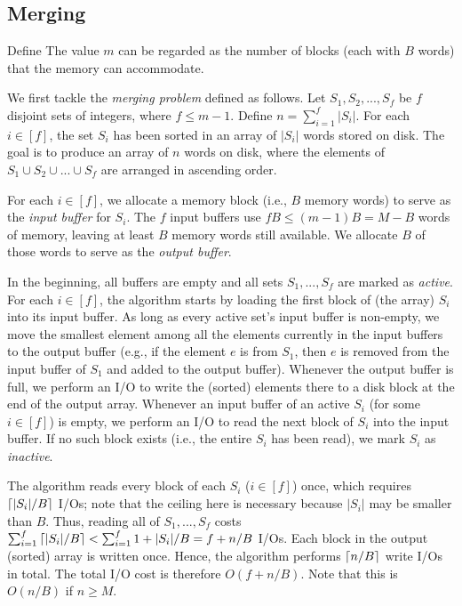 \subsection{Merging} \label{sec:sort:merge}

Define
The value $m$ can be regarded as the number of blocks (each with $B$ words) that the memory can accommodate.

\vgap

We first tackle the {\em merging problem} defined as follows. Let $S_1, S_2, ..., S_f$ be $f$ disjoint sets of integers, where $f \le m - 1$. Define $n = \sum_{i=1}^f |S_i|$. For each $i \in [f]$, the set $S_i$ has been sorted in an array of $|S_i|$ words stored on disk. The goal is to produce an array of $n$ words on disk, where the elements of $S_1 \cup S_2 \cup ... \cup S_f$ are arranged in ascending order.

\vgap

For each $i \in [f]$, we allocate a memory block (i.e., $B$ memory words) to serve as the {\em input buffer} for $S_i$. The $f$ input buffers use $f B \le (m - 1) B = M - B$ words of memory, leaving at least $B$ memory words still available. We allocate $B$ of those words to serve as the {\em output buffer}.

\vgap

In the beginning, all buffers are empty and all sets $S_1, ..., S_f$ are marked as {\em active}. For each $i \in [f]$, the algorithm starts by loading the first block of (the array) $S_i$ into its input buffer. As long as every active set's input buffer is non-empty, we move the smallest element among all the elements currently in the input buffers to the output buffer (e.g., if the element $e$ is from $S_1$, then $e$ is removed from the input buffer of $S_1$ and added to the output buffer). Whenever the output buffer is full, we perform an I/O to write the (sorted) elements there to a disk block at the end of the output array. Whenever an input buffer of an active $S_i$ (for some $i \in [f]$) is empty, we perform an I/O to read the next block of $S_i$ into the input buffer. If no such block exists (i.e., the entire $S_i$ has been read), we mark $S_i$ as {\em inactive}.

\vgap

The algorithm reads every block of each $S_i$ ($i \in [f]$) once, which requires $\left \lceil |S_i|/B \right \rceil$ I/Os; note that the ceiling here is necessary because $|S_i|$ may be smaller than $B$. Thus, reading all of $S_1, ..., S_f$ costs $\sum_{i=1}^f \left \lceil |S_i|/B \right \rceil < \sum_{i=1}^f 1 + |S_i|/B = f + n/B$ I/Os. Each block in the output (sorted) array is written once. Hence, the algorithm performs $\left \lceil n/B \right \rceil$ write I/Os in total. The total I/O cost is therefore $O(f + n/B)$. Note that this is $O(n/B)$ if $n \ge M$.


